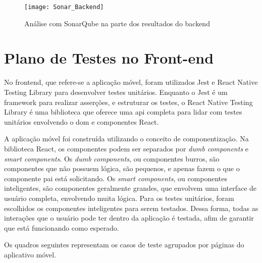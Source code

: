 \begin{figure}[H]
  \centering
  \caption{Análise com SonarQube na parte dos resultados do \gls{backend}}
  \label{fig:sonarqube-backend}
  \texttt{[image: Sonar\_Backend]}
\end{figure}


\section{Plano de Testes no Front-end}

No \gls{frontend}, que refere-se a aplicação móvel, foram utilizados Jest e React Native Testing Library para desenvolver testes unitários. Enquanto o Jest é um \gls{framework} para realizar asserções, e estruturar os testes, o React Native Testing Library é uma biblioteca que oferece uma \gls{api} completa para lidar com testes unitários envolvendo o \gls{dom} e componentes React.

A aplicação móvel foi construída utilizando o conceito de componentização. Na biblioteca React, os componentes podem ser separados por \textit{dumb components} e \textit{smart components}. Os \textit{dumb components}, ou componentes burros, são componentes que não possuem lógica, são pequenos, e apenas fazem o que o componente pai está solicitando. Os \textit{smart components}, ou componentes inteligentes, são componentes geralmente grandes, que envolvem uma interface de usuário completa, envolvendo muita lógica. Para os testes unitários, foram escolhidos os componentes inteligentes para serem testados. Dessa forma, todas as interações que o usuário pode ter dentro da aplicação é testada, afim de garantir que está funcionando como esperado.

Os quadros seguintes representam os casos de teste agrupados por páginas do aplicativo móvel.

